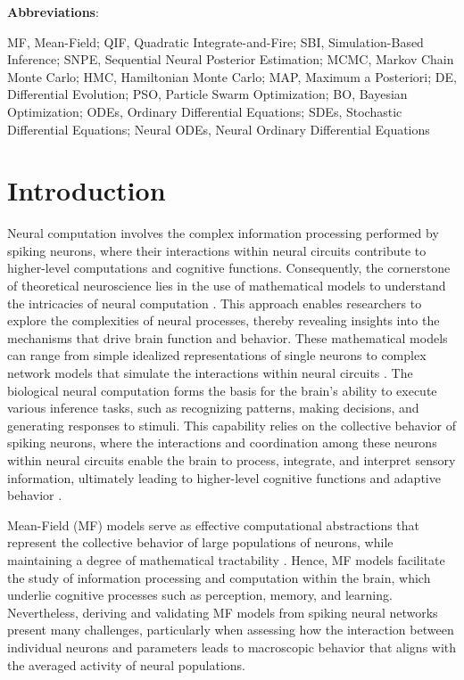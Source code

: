 \documentclass[preprint,11pt,authoryear]{elsarticle}
\begin{document}
\small
\textbf{Abbreviations}:

 MF, Mean-Field; QIF, Quadratic Integrate-and-Fire; SBI, Simulation-Based Inference;  SNPE, Sequential Neural Posterior Estimation; MCMC, Markov Chain Monte Carlo; HMC, Hamiltonian Monte Carlo; MAP, Maximum a Posteriori; DE, Differential Evolution; PSO, Particle Swarm Optimization; BO, Bayesian Optimization; ODEs, Ordinary Differential Equations; SDEs, Stochastic Differential Equations; Neural ODEs, Neural Ordinary Differential Equations\\



\section{Introduction}
\label{Introduction}

Neural computation involves the complex information processing performed by spiking neurons, where their interactions within neural circuits contribute to higher-level computations and cognitive functions. Consequently, the cornerstone of theoretical neuroscience lies in the use of mathematical models to understand the intricacies of neural computation \citep{Dayan2005, Hertz2018}. This approach enables researchers to explore the complexities of neural processes, thereby revealing insights into the mechanisms that drive brain function and behavior. These mathematical models can range from simple idealized representations of single neurons \citep{Hopfield1982, Izhikevich2003} to complex network models that simulate the interactions within neural circuits \citep{Marder1998, Sussillo2014, Leary2015,  Bittner2021}. 
The biological neural computation forms the basis for the brain's ability to execute various inference tasks, such as recognizing patterns, making decisions, and generating responses to stimuli. This capability relies on the collective behavior of spiking neurons, where the interactions and coordination among these neurons within neural circuits enable the brain to process, integrate, and interpret sensory information, ultimately leading to higher-level cognitive functions and adaptive behavior \citep{Kandel2000, Gerstner2014, Friston2009, Friston2017}. 


Mean-Field (MF) models serve as effective computational abstractions that represent the collective behavior of large populations of neurons, while maintaining a degree of mathematical tractability \citep{Amari1977, Wilson1973, Jirsa1996, David2003, Deco2008, Hutt2015, Coombes2018, Bandyopadhyay2021, Cook2022}. Hence,  MF models facilitate the study of information processing and computation within the brain, which underlie cognitive processes such as perception, memory, and learning. Nevertheless, deriving and validating MF models from spiking neural networks present many challenges, particularly when assessing how the interaction between individual neurons and parameters leads to macroscopic behavior that aligns with the averaged activity of neural populations.
\end{document}
